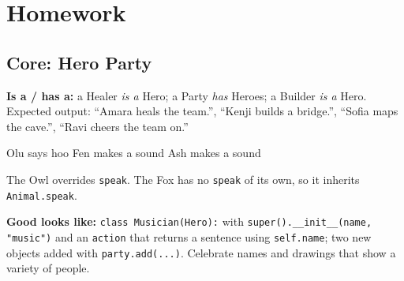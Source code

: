 \section{Homework}
\subsection{Core: Hero Party}
\begin{answer}
\textbf{Is a / has a:} a Healer \emph{is a} Hero; a Party \emph{has} Heroes; a Builder \emph{is a} Hero.\\
Expected output: \enquote{Amara heals the team.}, \enquote{Kenji builds a bridge.}, \enquote{Sofia maps the cave.}, \enquote{Ravi cheers the team on.}
\end{answer}

\begin{answer}
\begin{outputcode}
Olu says hoo
Fen makes a sound
Ash makes a sound
\end{outputcode}
The Owl overrides \texttt{speak}. The Fox has no \texttt{speak} of its own, so it inherits \texttt{Animal.speak}.
\end{answer}

\begin{answer}
\textbf{Good looks like:} \texttt{class Musician(Hero):} with \texttt{super().\_\_init\_\_(name, "music")} and an \texttt{action} that returns a sentence using \texttt{self.name}; two new objects added with \texttt{party.add(...)}. Celebrate names and drawings that show a variety of people.
\end{answer}
